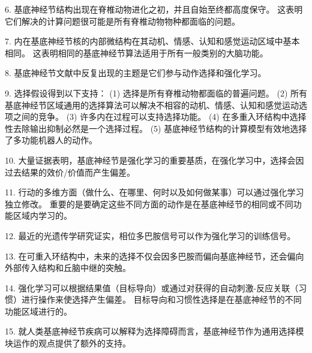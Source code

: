 6. 基底神经节结构出现在脊椎动物进化之初，并且自始至终都高度保守。 这表明它们解决的计算问题很可能是所有脊椎动物物种都面临的问题。 

7. 内在基底神经节核的内部微结构在其动机、情感、认知和感觉运动区域中基本相同。 这表明相同的基底神经节算法适用于所有一般类别的大脑功能。 

8. 基底神经节文献中反复出现的主题是它们参与动作选择和强化学习。 

9. 选择假设得到以下支持： (1) 选择是所有脊椎动物都面临的普遍问题。 (2) 所有基底神经节区域通用的选择算法可以解决不相容的动机、情感、认知和感觉运动选项之间的竞争。 (3) 许多内在过程可以支持选择功能。 (4) 在多重入环结构中选择性去除输出抑制必然是一个选择过程。 (5) 基底神经节结构的计算模型有效地选择了多功能机器人的动作。 

10. 大量证据表明，基底神经节是强化学习的重要基质，在强化学习中，选择会因过去结果的效价/价值而产生偏差。 

11. 行动的多维方面（做什么、在哪里、何时以及如何做某事）可以通过强化学习独立修改。 重要的是要确定这些不同方面的动作是在基底神经节的相同或不同功能区域内学习的。 

12. 最近的光遗传学研究证实，相位多巴胺信号可以作为强化学习的训练信号。 

13. 在可重入环结构中，未来的选择不仅会因多巴胺而偏向基底神经节，还会偏向外部传入结构和丘脑中继的突触。 

14. 强化学习可以根据结果值（目标导向）或通过对获得的自动刺激-反应关联（习惯）进行操作来使选择产生偏差。 目标导向和习惯性选择是在基底神经节的不同功能区域进行的。 

15. 就人类基底神经节疾病可以解释为选择障碍而言，基底神经节作为通用选择模块运作的观点提供了额外的支持。

